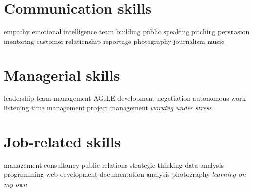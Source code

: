 \documentclass[]{friggeri-cv}
\begin{document}
\begin{aside}
\section{Communication skills}
    empathy
    emotional intelligence
    team building
    public speaking
    pitching
    persuasion
    mentoring
    customer relationship
    reportage
    photography
    journalism
    music
\section{Managerial skills}
    leadership
    team management
    AGILE development
    negotiation
    autonomous work
    listening
    time management
    project management
    \emph{working under stress}
\section{Job-related skills}
    management
    consultancy
    public relations
    strategic thinking
    data analysis
    programming
    web development
    documentation
    analysis
    photography
    \emph{learning on my own}
\end{aside}
\end{document}
